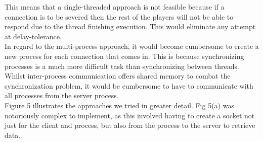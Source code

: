 \documentclass[11pt]{article}
\begin{document}
This means that a single-threaded approach is not feasible because if a connection is to be severed then the rest of the players will not be able to respond due to the thread finishing execution. This would eliminate any attempt at delay-tolerance. \\

In regard to the multi-process approach, it would become cumbersome to create a new process for each connection that comes in. This is because synchronizing processes is a much more difficult task than synchronizing between threads. Whilst inter-process communication offers shared memory \citep{shared_memory} to combat the synchronization problem, it would be cumbersome to have to communicate with all processes from the server process.\\
\newpage
Figure 5 illustrates the approaches we tried in greater detail. Fig 5(a) was notoriously complex to implement, as this involved having to create a socket not just for the client and process, but also from the process to the server to retrieve data. \\
\end{document}

